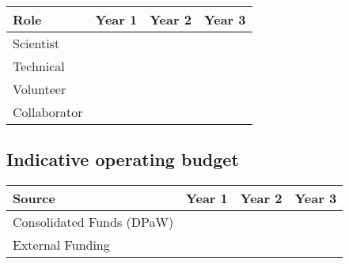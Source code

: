 \documentclass[version=last,
    paper=a4, %
    10pt, %
    usenames,
    dvipsnames,
    oneside, %
    headings=openany, %
    DIV=15 %
]{scrbook}
\begin{document}
\begin{longtabu} to \linewidth { |  X | X | X | X | }
\hline
{}
Role & Year 1 & Year 2 & Year 3\\
\hline
\endhead



Scientist &  &  & \\



Technical &  &  & \\



Volunteer &  &  & \\



Collaborator &  &  & \\


\hline
\end{longtabu}



\subsection*{Indicative operating budget }



\begin{longtabu} to \linewidth { |  X | X | X | X | }
\hline
{}
Source & Year 1 & Year 2 & Year 3\\
\hline
\endhead



Consolidated Funds (DPaW) &  &  & \\



External Funding &  &  & \\


\hline
\end{longtabu}






\end{document}

